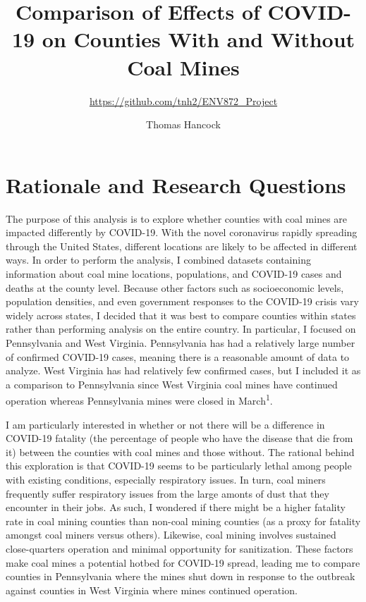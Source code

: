 \documentclass[
  12pt,
]{article}
\title{Comparison of Effects of COVID-19 on Counties With and Without Coal
Mines}
\subtitle{\url{https://github.com/tnh2/ENV872_Project}}
\author{Thomas Hancock}
\date{}
\begin{document}
\maketitle

\newpage
\tableofcontents 
\newpage
\listoftables 
\newpage
\listoffigures 
\newpage

\hypertarget{rationale-and-research-questions}{%
\section{Rationale and Research
Questions}\label{rationale-and-research-questions}}

The purpose of this analysis is to explore whether counties with coal
mines are impacted differently by COVID-19. With the novel coronavirus
rapidly spreading through the United States, different locations are
likely to be affected in different ways. In order to perform the
analysis, I combined datasets containing information about coal mine
locations, populations, and COVID-19 cases and deaths at the county
level. Because other factors such as socioeconomic levels, population
densities, and even government responses to the COVID-19 crisis vary
widely across states, I decided that it was best to compare counties
within states rather than performing analysis on the entire country. In
particular, I focused on Pennsylvania and West Virginia. Pennsylvania
has had a relatively large number of confirmed COVID-19 cases, meaning
there is a reasonable amount of data to analyze. West Virginia has had
relatively few confirmed cases, but I included it as a comparison to
Pennsylvania since West Virginia coal mines have continued operation
whereas Pennsylvania mines were closed in March\textsuperscript{1}.

I am particularly interested in whether or not there will be a
difference in COVID-19 fatality (the percentage of people who have the
disease that die from it) between the counties with coal mines and those
without. The rational behind this exploration is that COVID-19 seems to
be particularly lethal among people with existing conditions, especially
respiratory issues. In turn, coal miners frequently suffer respiratory
issues from the large amonts of dust that they encounter in their jobs.
As such, I wondered if there might be a higher fatality rate in coal
mining counties than non-coal mining counties (as a proxy for fatality
amongst coal miners versus others). Likewise, coal mining involves
sustained close-quarters operation and minimal opportunity for
sanitization. These factors make coal mines a potential hotbed for
COVID-19 spread, leading me to compare counties in Pennsylvania where
the mines shut down in response to the outbreak against counties in West
Virginia where mines continued operation.
\end{document}
